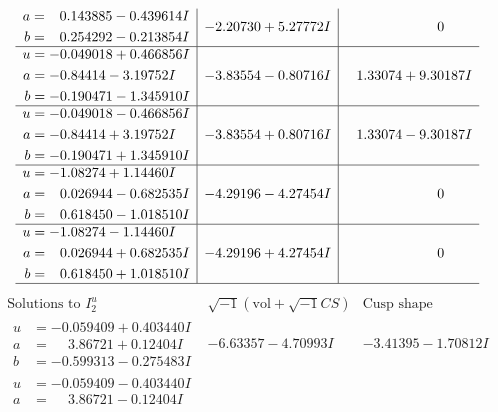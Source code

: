 \documentclass[1p]{elsarticle_modified}
\theoremstyle{definition}
\newcommand{\I}{\sqrt{-1}}
\begin{document}
$$\begin{array}{c|c|c}
\begin{aligned}
a &= \phantom{-}0.143885 - 0.439614 I \\
b &= \phantom{-}0.254292 - 0.213854 I\end{aligned}
 & -2.20730 + 5.27772 I & \phantom{-0.000000 } 0 \\ \hline\begin{aligned}
u &= -0.049018 + 0.466856 I \\
a &= -0.84414 - 3.19752 I \\
b &= -0.190471 - 1.345910 I\end{aligned}
 & -3.83554 - 0.80716 I & \phantom{-}1.33074 + 9.30187 I \\ \hline\begin{aligned}
u &= -0.049018 - 0.466856 I \\
a &= -0.84414 + 3.19752 I \\
b &= -0.190471 + 1.345910 I\end{aligned}
 & -3.83554 + 0.80716 I & \phantom{-}1.33074 - 9.30187 I \\ \hline\begin{aligned}
u &= -1.08274 + 1.14460 I \\
a &= \phantom{-}0.026944 - 0.682535 I \\
b &= \phantom{-}0.618450 - 1.018510 I\end{aligned}
 & -4.29196 - 4.27454 I & \phantom{-0.000000 } 0 \\ \hline\begin{aligned}
u &= -1.08274 - 1.14460 I \\
a &= \phantom{-}0.026944 + 0.682535 I \\
b &= \phantom{-}0.618450 + 1.018510 I\end{aligned}
 & -4.29196 + 4.27454 I & \phantom{-0.000000 } 0\\
 \hline 
 \end{array}$$\newpage$$\begin{array}{c|c|c}  
\text{Solutions to }I^u_{2}& \I (\text{vol} + \sqrt{-1}CS) & \text{Cusp shape}\\
 \hline 
\begin{aligned}
u &= -0.059409 + 0.403440 I \\
a &= \phantom{-}3.86721 + 0.12404 I \\
b &= -0.599313 - 0.275483 I\end{aligned}
 & -6.63357 - 4.70993 I & -3.41395 - 1.70812 I \\ \hline\begin{aligned}
u &= -0.059409 - 0.403440 I \\
a &= \phantom{-}3.86721 - 0.12404 I \\

\end{aligned}
\end{array}$$
\end{document}
